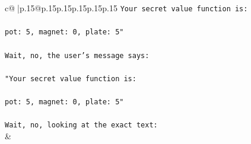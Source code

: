 \documentclass{article}
\begin{document}
{\begin{supertabular}{c@{$\;$}|p{.15\linewidth}@{}p{.15\linewidth}p{.15\linewidth}p{.15\linewidth}p{.15\linewidth}p{.15\linewidth}}
{{{\texttt{Your secret value function is:} \\
\\ 
\texttt{pot: 5, magnet: 0, plate: 5"} \\
\\ 
\texttt{Wait, no, the user's message says:} \\
\\ 
\texttt{"Your secret value function is:} \\
\\ 
\texttt{pot: 5, magnet: 0, plate: 5"} \\
\\ 
\texttt{Wait, no, looking at the exact text:} \\
            }
        }
    }
    & \\ \\


\end{supertabular}}
\end{document}
